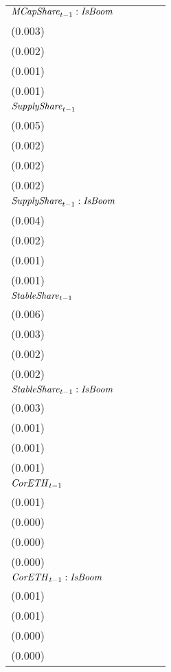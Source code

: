\begin{tabular}{lllll}
${{\it MCapShare}}_{t-1} : {\it IsBoom}$    &      \makecell{$0.004^{}$ \\ (0.003)} &   \makecell{$0.034^{***}$ \\ (0.002)} &   \makecell{$0.019^{***}$ \\ (0.001)} &   \makecell{$0.011^{***}$ \\ (0.001)} \\
${{\it SupplyShare}}_{t-1}$                 &   \makecell{$0.041^{***}$ \\ (0.005)} &   \makecell{$0.006^{***}$ \\ (0.002)} &      \makecell{$0.002^{}$ \\ (0.002)} &   \makecell{$0.023^{***}$ \\ (0.002)} \\
${{\it SupplyShare}}_{t-1} : {\it IsBoom}$  &     \makecell{$-0.000^{}$ \\ (0.004)} &      \makecell{$0.002^{}$ \\ (0.002)} &      \makecell{$0.002^{}$ \\ (0.001)} &  \makecell{$-0.008^{***}$ \\ (0.001)} \\
${{\it StableShare}}_{t-1}$                 &   \makecell{$0.140^{***}$ \\ (0.006)} &      \makecell{$0.004^{}$ \\ (0.003)} &     \makecell{$-0.002^{}$ \\ (0.002)} &   \makecell{$0.058^{***}$ \\ (0.002)} \\
${{\it StableShare}}_{t-1} : {\it IsBoom}$  &  \makecell{$-0.021^{***}$ \\ (0.003)} &  \makecell{$-0.011^{***}$ \\ (0.001)} &  \makecell{$-0.005^{***}$ \\ (0.001)} &  \makecell{$-0.019^{***}$ \\ (0.001)} \\
${{\it CorETH}}_{t-1}$                      &      \makecell{$0.000^{}$ \\ (0.001)} &      \makecell{$0.000^{}$ \\ (0.000)} &      \makecell{$0.000^{}$ \\ (0.000)} &      \makecell{$0.000^{}$ \\ (0.000)} \\
${{\it CorETH}}_{t-1} : {\it IsBoom}$       &  \makecell{$-0.003^{***}$ \\ (0.001)} &      \makecell{$0.000^{}$ \\ (0.001)} &     \makecell{$-0.000^{}$ \\ (0.000)} &  \makecell{$-0.001^{***}$ \\ (0.000)} \\

\end{tabular}
